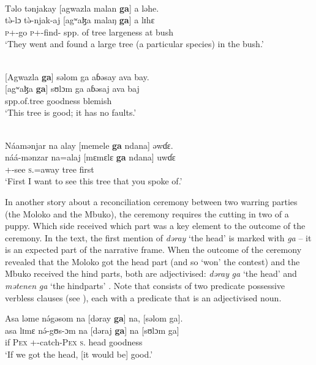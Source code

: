 \ea \label{ex:5:52}\\
Təlo  tənjakay  [agwazla  malan  \textbf{ga}]  a  ləhe.\\
\gll  t\`{ə}-lɔ  t\`{ə}-njak-aj        [agʷaɮa      malaŋ    \textbf{ga}]   a    lɪhɛ\\
      \textsc{p}+{\PFV}-go   \textsc{p}+{\PFV}-find-{\CL}   {spp. of tree}     largeness {\ADJ}   at   bush\\
\glt  ‘They went and found a large tree (a particular species) in the bush.’ 
\z


\ea \label{ex:5:53}\\
{}[Agwazla  \textbf{ga}]  səlom  ga  aɓəsay  ava  bay.\\
\gll  {}[agʷaɮa  \textbf{ga}]    sʊlɔm    ga     aɓəsaj     ava     baj\\
      {spp.of.tree} {\ADJ}   goodness  {\ADJ}     blemish   {\EXT}   {\NEG}\\
\glt  ‘This tree is good;  it has no faults.’
\z


\ea \label{ex:5:54}\\
Náamənjar  na  alay  [memele  \textbf{ga}  ndana]  əwɗɛ.\\
\gll  náá-mənzar     na=alaj   [mɛmɛlɛ  \textbf{ga}   ndana]  uwɗɛ\\
      {\oneS}+{\POT}-see     \textsc{s}.{\DO}=away   tree   {\ADJ}   {\DEM}   first\\
\glt  ‘First I want to see this tree that you spoke of.’
\z

In another story about a reconciliation ceremony between two warring parties (the Moloko and the Mbuko), the ceremony requires the cutting in two of a puppy. Which side received which part was a key element to the outcome of the ceremony. In the text, the first mention of \textit{dəray} ‘the head’  is marked with \textit{ga} -- it is an expected part of the narrative frame.  When the outcome of the ceremony revealed that the Moloko got the head part (and so ‘won’ the contest) and the Mbuko received the hind parts, both are adjectivised:  \textit{dəray} \textit{ga} ‘the head’ and \textit{mətenen} \textit{ga} ‘the hindparts’ . Note that  consists of two predicate possessive verbless clauses (see ), each with a predicate that is an adjectivised noun. 

\ea \label{ex:5:55}
Asa  ləme  n\'{ə}gəsom  na  [dəray  \textbf{ga}]  na,  [səlom  ga].\\
\gll  asa  lɪmɛ  n\'{ə}-gʊs-ɔm    na      [dəraj    \textbf{ga}]    na  [sʊlɔm       ga]\\
      if    \textsc{Pex}  {\oneS}+{\IFV}-catch-\textsc{Pex}    \textsc{s}.{\DO}  head  {\ADJ}     {\PSP}  goodness     {\ADJ}\\
\glt  ‘If we got the head, [it would be] good.'
\z

